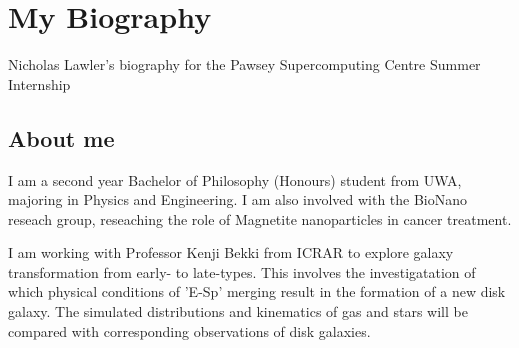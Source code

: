 \section{My Biography}
Nicholas Lawler's biography for the Pawsey Supercomputing Centre Summer Internship
\subsection{About me}
I am a second year Bachelor of Philosophy (Honours) student from UWA, majoring in Physics and Engineering. I am also involved with the BioNano reseach group, reseaching the role of Magnetite nanoparticles in cancer treatment. 

I am working with Professor Kenji Bekki from ICRAR to explore galaxy transformation from early- to late-types. This involves the investigatation of which physical conditions of 'E-Sp' merging result in the formation of a new disk galaxy. The simulated distributions and kinematics of gas and stars will be compared with corresponding observations of disk galaxies.
